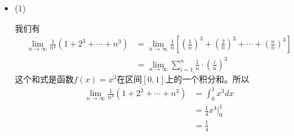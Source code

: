 \documentclass{article}
\begin{document}
\begin{itemize}
  \item (1)

        我们有
        \begin{align*}
          \lim \limits_{n \to \infty} \frac{1}{n^4}(1 + 2^3 + \cdots + n^3)
           & = \lim \limits_{n \to \infty} \frac{1}{n} \left[(\frac{1}{n})^3 + (\frac{2}{n})^3 + \cdots + (\frac{n}{n})^3 \right] \\
           & = \lim \limits_{n \to \infty} \sum \limits_{i = 1}^n \frac{1}{n} \cdot \left(\frac{i}{n}\right)^3
        \end{align*}
        这个和式是函数$f(x) = x^3$在区间$[0, 1]$上的一个积分和。所以
        \begin{align*}
          \lim \limits_{n \to \infty} \frac{1}{n^4}(1 + 2^3 + \cdots + n^3)
           & = \int_{0}^{1} x^3 dx       \\
           & = \frac{1}{4}x^4 \bigg|_0^1 \\
           & = \frac{1}{4}
        \end{align*}


\end{itemize}
\end{document}
